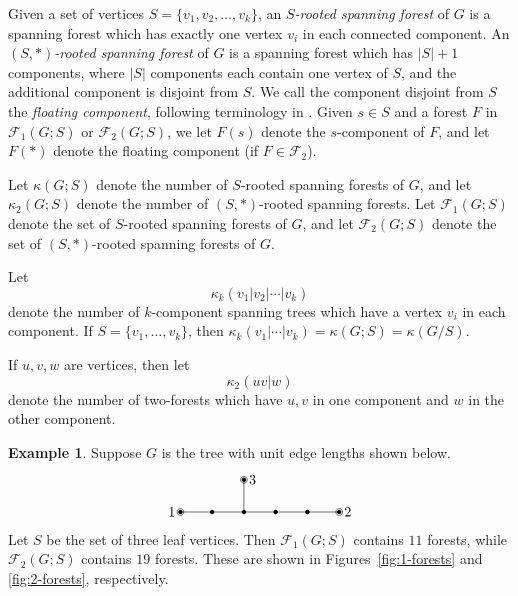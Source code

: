 \documentclass{amsart}
\theoremstyle{definition}
\newtheorem{eg}[thm]{Example}
\newcommand{\trees}{\mathcal{F}_1}
\newcommand{\forests}{\mathcal{F}}
\begin{document}
Given a set of vertices $S = \{v_1, v_2, \ldots, v_k\}$,
an {\em $S$-rooted spanning forest} of $G$ 
is a spanning forest which has exactly one vertex $v_i$ in each connected component.
An {\em $(S,*)$-rooted spanning forest} of $G$ is a spanning forest which has $|S|+1$ components, where $|S|$ components each contain one vertex of $S$, and the additional component is disjoint from $S$.
We call the component disjoint from $S$ the {\em floating component}, following terminology in \cite{kassel-kenyon-wu}.
Given $s \in S$ and a forest $F$ in $\trees(G; S)$ or $\forests_2(G; S)$, we let $F(s)$ denote the $s$-component of $F$, and let $F(*)$ denote the floating component (if $F \in \forests_2$).

Let $\kappa(G;S)$ denote the number of $S$-rooted spanning forests of $G$, and let $\kappa_2(G; S)$ denote the number of $(S,*)$-rooted spanning forests.
Let $\trees(G;S)$ denote the set of $S$-rooted spanning forests of $G$,
and let $\forests_2(G;S)$ denote the set of $(S,*)$-rooted spanning forests of $G$.

Let 
\[
	\kappa_k(v_1|v_2| \cdots | v_k)
\]
denote the number of $k$-component spanning trees which have a vertex $v_i$ in each component.
If $S = \{v_1,\ldots, v_k\}$,
then $\kappa_k(v_1|\cdots| v_k) = \kappa(G; S) =  \kappa(G/S)$.

If $u, v, w$ are vertices, then let
\[
	\kappa_2(u v | w)
\]
denote the number of two-forests which have $u, v$ in one component and $w$ in the other component.

\begin{eg}
Suppose $G$ is the tree with unit edge lengths shown below.
\[
\begin{tikzpicture}[scale=0.8]
	\coordinate (1) at (0,0);
	\coordinate (A) at (1,0);
	\coordinate (B) at (2,0);
	\coordinate (C) at (3,0);
	\coordinate (D) at (4,0);
	\coordinate (2) at (5,0);
	\coordinate (3) at (2,1);
	
	\foreach \c in {1,2,3,A,B,C,D} {
		\fill (\c) circle (2pt);
	}
	\foreach \c in {1,2,3} {
		\draw (\c) circle (3pt);
	}

	\draw (1) -- (A);
	\draw (A) -- (B);
	\draw (B) -- (3);
	\draw (B) -- (C);
	\draw (C) -- (D);
	\draw (D) -- (2);
	
	\foreach \c/\d in {1/left,2/right,3/right} {
		\node[\d=0.2] at (\c) {$\c$};
	}
\end{tikzpicture}
\]
Let $S$ be the set of three leaf vertices.
Then $\trees(G;S)$ contains $11$ forests,
while $\forests_2(G;S)$ contains $19$ forests.
These are shown in Figures~\ref{fig:1-forests} and \ref{fig:2-forests}, respectively.
\end{eg}
\end{document}
